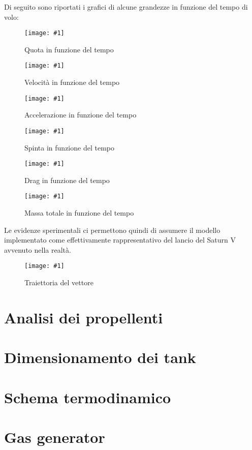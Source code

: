 \documentclass[11pt,a4paper,twocolumn]{article}
\newcommand{\figura}[3]{
\begin{figure}[H]
	\centering
	\texttt{[image: \#1]}
	\caption{#2}
	\label{fig:#3}
\end{figure}
}
\begin{document}
Di seguito sono riportati i grafici di alcune grandezze in funzione del tempo di volo:

\figura{01_quota_t}{Quota in funzione del tempo}{quota_t}

\figura{02_velocita_t}{Velocità in funzione del tempo}{velocita_t}

\figura{03_accelerazione_t}{Accelerazione in funzione del tempo}{accelerazione_t}

\figura{04_spinta_t}{Spinta in funzione del tempo}{spinta_t}

\figura{05_drag_t}{Drag in funzione del tempo}{drag_t}

\figura{06_massa_t}{Massa totale in funzione del tempo}{massa_t}



Le evidenze sperimentali ci permettono quindi di assumere il modello implementato come effettivamente rappresentativo del lancio del Saturn V avvenuto nella realtà.


\figura{07_traiettoria}{Traiettoria del vettore}{traiettoria}




\section{Analisi dei propellenti}

\label{sec:analisi propellenti}




\section{Dimensionamento dei tank}

\label{sec:dimensionamento tank}



\section{Schema termodinamico}

\label{sec:schema termodinamico}



\section{Gas generator}
\end{document}
